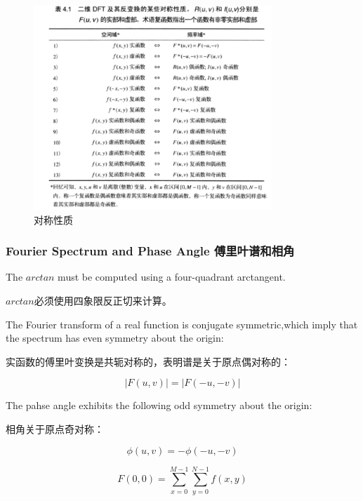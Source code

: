 \documentclass[12pt]{article}
\numberwithin{equation}{section}%
\begin{document}
\begin{figure}[!htb] %
\centering
\includegraphics[width=0.8\textwidth]{symmetry_properties.png}
\caption{对称性质}
\label{fig:1}
\end{figure}

\subsubsection{Fourier Spectrum and Phase Angle 傅里叶谱和相角}

The $arctan$ must be computed using a four-quadrant arctangent.

$arctan$必须使用四象限反正切来计算。

The Fourier transform of a real function is conjugate symmetric,which imply that the spectrum has even symmetry about the origin:

实函数的傅里叶变换是共轭对称的，表明谱是关于原点偶对称的：

\begin{equation} \label{4.38}
|F(u,v)|=|F(-u,-v)|
\end{equation} 

The pahse angle exhibits the following odd symmetry about the origin:

相角关于原点奇对称：

\begin{equation} \label{4.39}
\phi(u,v)=-\phi(-u,-v)
\end{equation} 

\begin{equation} \label{4.40}
F(0,0)=\sum_{x=0}^{M-1}\sum_{y=0}^{N-1}f(x,y)
\end{equation} 
\end{document}
